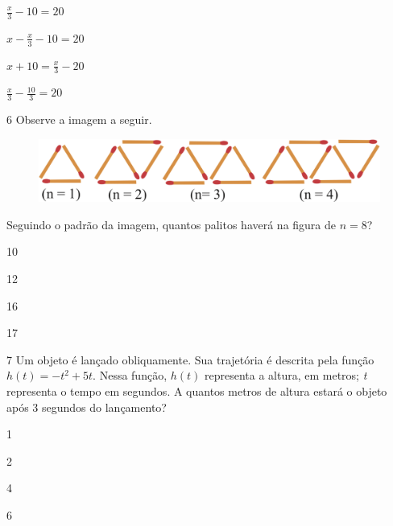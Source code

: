 \begin{escolha}

\item $\frac{x}{3} - 10 = 20$ 

\item $x - \frac{x}{3} - 10 = 20$ 

\item $x + 10 = \frac{x}{3} - 20$ 

\item $\frac{x}{3} - \frac{10}{3} = 20$ 

\end{escolha}

\pagebreak
\num{6} Observe a imagem a seguir.

\begin{figure}[htpb!]
\centering
\includegraphics[width=\textwidth]{./ilustras-mat/Simulado_1-atividade_6.png}
\end{figure}

Seguindo o padrão da imagem, quantos palitos haverá na figura de $n = 8$?

\begin{multicols}{2}
\begin{escolha}

  \item 10

  \item 12

  \item 16

  \item 17

\end{escolha}
\end{multicols}

\num{7} Um objeto é lançado obliquamente. Sua trajetória é descrita pela
função $h(t) = - t^{2} + 5t$. Nessa função, $h(t)$ representa a altura, em
metros; \textit{t} representa o tempo em segundos. A quantos metros de altura
estará o objeto após 3 segundos do lançamento?

\begin{escolha}

  \item 1

  \item 2

  \item 4

  \item 6

\end{escolha}

